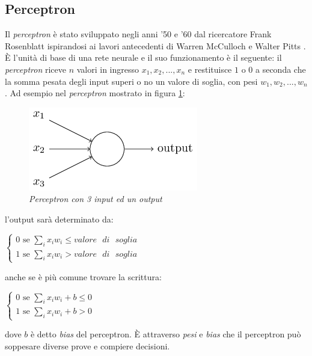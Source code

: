\documentclass[12pt,a4paper]{report}
\begin{document}
\subsection{Perceptron}\label{percettrone}

Il \textit{perceptron} è stato sviluppato negli anni '50 e '60 dal ricercatore Frank Rosenblatt ispirandosi ai lavori antecedenti di Warren McCulloch e Walter Pitts \cite{neural-net-nielsen}.
È l'unità di base di una rete neurale e il suo funzionamento è il seguente:
il \textit{perceptron} riceve $n$ valori in ingresso $x_{1},x_{2},...,x_{n}$ e restituisce $1$ o $0$ a seconda che la somma pesata degli input superi o no un valore di soglia, con pesi $w_{1},w_{2},...,w_{n}$.
Ad esempio nel \textit{perceptron} mostrato in figura \ref{perceptron}:

\begin{figure}[H]
 \centering
 \includegraphics[scale = 0.7]{images/perceptron.png}
 \caption{\textit{Perceptron con 3 input ed un output}}
 \label{perceptron}
\end{figure}

l'output sarà determinato da:

\begin{center}
$\begin{cases}
 0 \text{ se } \sum_{i} x_{i}w_{i} \leq valore\text{ }di\text{ }soglia\\
 1 \text{ se } \sum_{i} x_{i}w_{i} > valore\text{ }di\text{ }soglia 
\end{cases} $
\end{center}

anche se è più comune trovare la scrittura:

\begin{center}
$\begin{cases}
 0 \text{ se } \sum_{i} x_{i}w_{i} + b \leq 0\\
 1 \text{ se } \sum_{i} x_{i}w_{i} + b > 0
\end{cases}$
\end{center}

dove $b$ è detto \textit{bias} del perceptron.
È attraverso \textit{pesi} e \textit{bias} che il perceptron può soppesare diverse prove e compiere decisioni.
\end{document}
